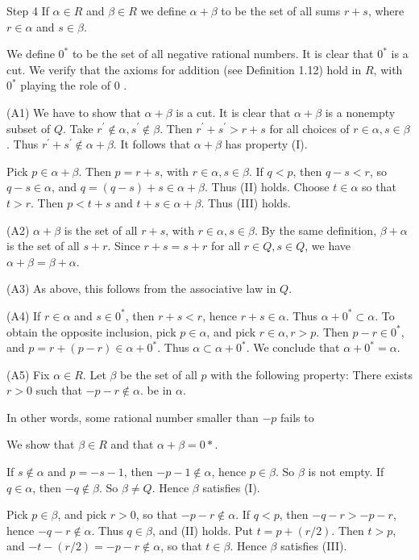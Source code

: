 \documentclass[10pt]{article}
\begin{document}
Step 4 If $\alpha \in R$ and $\beta \in R$ we define $\alpha+\beta$ to be the set of all sums $r+s$, where $r \in \alpha$ and $s \in \beta$.

We define $0^{*}$ to be the set of all negative rational numbers. It is clear that $0^{*}$ is a cut. We verify that the axioms for addition (see Definition 1.12) hold in $R$, with $0^{*}$ playing the role of 0 .

(A1) We have to show that $\alpha+\beta$ is a cut. It is clear that $\alpha+\beta$ is a nonempty subset of $Q$. Take $r^{\prime} \notin \alpha, s^{\prime} \notin \beta$. Then $r^{\prime}+s^{\prime}>r+s$ for all choices of $r \in \alpha, s \in \beta$. Thus $r^{\prime}+s^{\prime} \notin \alpha+\beta$. It follows that $\alpha+\beta$ has property (I).

Pick $p \in \alpha+\beta$. Then $p=r+s$, with $r \in \alpha, s \in \beta$. If $q<p$, then $q-s<r$, so $q-s \in \alpha$, and $q=(q-s)+s \in \alpha+\beta$. Thus (II) holds. Choose $t \in \alpha$ so that $t>r$. Then $p<t+s$ and $t+s \in \alpha+\beta$. Thus (III) holds.

(A2) $\alpha+\beta$ is the set of all $r+s$, with $r \in \alpha, s \in \beta$. By the same definition, $\beta+\alpha$ is the set of all $s+r$. Since $r+s=s+r$ for all $r \in Q, s \in Q$, we have $\alpha+\beta=\beta+\alpha$.

(A3) As above, this follows from the associative law in $Q$.

(A4) If $r \in \alpha$ and $s \in 0^{*}$, then $r+s<r$, hence $r+s \in \alpha$. Thus $\alpha+0^{*} \subset \alpha$. To obtain the opposite inclusion, pick $p \in \alpha$, and pick $r \in \alpha, r>p$. Then
$p-r \in 0^{*}$, and $p=r+(p-r) \in \alpha+0^{*}$. Thus $\alpha \subset \alpha+0^{*}$. We conclude that $\alpha+0^{*}=\alpha$.

(A5) Fix $\alpha \in R$. Let $\beta$ be the set of all $p$ with the following property: There exists $r>0$ such that $-p-r \notin \alpha$. be in $\alpha$.

In other words, some rational number smaller than $-p$ fails to

We show that $\beta \in R$ and that $\alpha+\beta=0 *$.

If $s \notin \alpha$ and $p=-s-1$, then $-p-1 \notin \alpha$, hence $p \in \beta$. So $\beta$ is not empty. If $q \in \alpha$, then $-q \notin \beta$. So $\beta \neq Q$. Hence $\beta$ satisfies (I).

Pick $p \in \beta$, and pick $r>0$, so that $-p-r \notin \alpha$. If $q<p$, then $-q-r>-p-r$, hence $-q-r \notin \alpha$. Thus $q \in \beta$, and (II) holds. Put $t=p+(r / 2)$. Then $t>p$, and $-t-(r / 2)=-p-r \notin \alpha$, so that $t \in \beta$. Hence $\beta$ satisfies (III).
\end{document}
